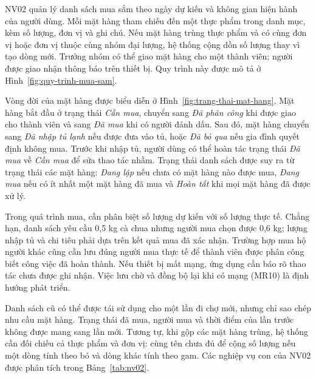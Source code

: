 NV02 quản lý danh sách mua sắm theo ngày dự kiến và không gian hiện hành của người dùng. Mỗi mặt hàng tham chiếu đến một thực phẩm trong danh mục, kèm số lượng, đơn vị và ghi chú. Nếu mặt hàng trùng thực phẩm và có cùng đơn vị hoặc đơn vị thuộc cùng nhóm đại lượng, hệ thống cộng dồn số lượng thay vì tạo dòng mới. Trưởng nhóm có thể giao mặt hàng cho một thành viên; người được giao nhận thông báo trên thiết bị. Quy trình này được mô tả ở Hình~\ref{fig:quy-trinh-mua-sam}.


Vòng đời của mặt hàng được biểu diễn ở Hình~\ref{fig:trang-thai-mat-hang}. Mặt hàng bắt đầu ở trạng thái \emph{Cần mua}, chuyển sang \emph{Đã phân công} khi được giao cho thành viên và sang \emph{Đã mua} khi có người đánh dấu. Sau đó, mặt hàng chuyển sang \emph{Đã nhập tủ lạnh} nếu được đưa vào tủ, hoặc \emph{Đã bỏ qua} nếu gia đình quyết định không mua. Trước khi nhập tủ, người dùng có thể hoàn tác trạng thái \emph{Đã mua} về \emph{Cần mua} để sửa thao tác nhầm. Trạng thái danh sách được suy ra từ trạng thái các mặt hàng: \emph{Đang lập} nếu chưa có mặt hàng nào được mua, \emph{Đang mua} nếu có ít nhất một mặt hàng đã mua và \emph{Hoàn tất} khi mọi mặt hàng đã được xử lý.


Trong quá trình mua, cần phân biệt số lượng dự kiến với số lượng thực tế. Chẳng hạn, danh sách yêu cầu 0,5 kg cà chua nhưng người mua chọn được 0,6 kg; lượng nhập tủ và chi tiêu phải dựa trên kết quả mua đã xác nhận. Trường hợp mua hộ người khác cũng cần lưu đúng người mua thực tế để thành viên được phân công biết công việc đã hoàn thành. Nếu thiết bị mất mạng, ứng dụng cần báo rõ thao tác chưa được ghi nhận. Việc lưu chờ và đồng bộ lại khi có mạng (MR10) là định hướng phát triển.

Danh sách cũ có thể được tái sử dụng cho một lần đi chợ mới, nhưng chỉ sao chép nhu cầu mặt hàng. Trạng thái đã mua, người mua và thời điểm của lần trước không được mang sang lần mới. Tương tự, khi gộp các mặt hàng trùng, hệ thống cần đối chiếu cả thực phẩm và đơn vị: cùng tên chưa đủ để cộng số lượng nếu một dòng tính theo bó và dòng khác tính theo gam. Các nghiệp vụ con của NV02 được phân tích trong Bảng~\ref{tab:nv02}.

